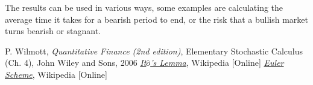 The results can be used in various ways, some examples are calculating the average time it takes for a bearish period to end, or the risk that a bullish market turns bearish or stagnant.

\begin{thebibliography}{9}
 P. Wilmott, \emph{Quantitative Finance (2nd edition)}, Elementary Stochastic Calculus (Ch. 4), John Wiley and Sons, 2006 
\href{https://en.wikipedia.org/wiki/It\%C3\%B4\%27s_lemma}{\emph{It$\hat{o}$'s Lemma}}, Wikipedia [Online]
 \href{https://en.wikipedia.org/wiki/Euler_method}{\emph{Euler Scheme}}, Wikipedia [Online]
\end{thebibliography}









